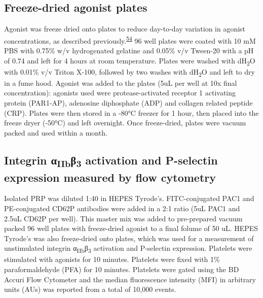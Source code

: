 \documentclass[11pt,twoside]{bristolthesis}
\begin{document}
\hypertarget{freeze-dried-agonist-plates}{%
\subsection{Freeze-dried agonist plates}\label{freeze-dried-agonist-plates}}

Agonist was freeze dried onto plates to reduce day-to-day variation in agonist concentrations, as described previously.\textsuperscript{\protect\hyperlink{ref-Chan2018}{54}} 96 well plates were coated with 10 mM PBS with 0.75\% w/v hydrogenated gelatine and 0.05\% v/v Tween-20 with a pH of 0.74 and left for 4 hours at room temperature. Plates were washed with dH\textsubscript{2}O with 0.01\% v/v Triton X-100, followed by two washes with dH\textsubscript{2}O and left to dry in a fume hood. Agonist was added to the plates (5uL per well at 10x final concentration): agonists used were protease-activated receptor 1 activating protein (PAR1-AP), adenosine diphosphate (ADP) and collagen related peptide (CRP). Plates were then stored in a -80°C freezer for 1 hour, then placed into the freeze dryer (-50°C) and left overnight. Once freeze-dried, plates were vacuum packed and used within a month.

\hypertarget{integrin-ux3b1iibux3b23-activation-and-p-selectin-expression-measured-by-flow-cytometry}{%
\subsection{\texorpdfstring{Integrin α\textsubscript{IIb}β\textsubscript{3} activation and P-selectin expression measured by flow cytometry}{Integrin αIIbβ3 activation and P-selectin expression measured by flow cytometry}}\label{integrin-ux3b1iibux3b23-activation-and-p-selectin-expression-measured-by-flow-cytometry}}

Isolated PRP was diluted 1:40 in HEPES Tyrode's. FITC-conjugated PAC1 and PE-conjugated CD62P antibodies were added in a 2:1 ratio (5uL PAC1 and 2.5uL CD62P per well). This master mix was added to pre-prepared vacuum packed 96 well plates with freeze-dried agonist to a final folume of 50 uL. HEPES Tyrode's was also freeze-dried onto plates, which was used for a measurement of unstimulated integrin α\textsubscript{IIb}β\textsubscript{3} activation and P-selectin expression. Platelets were stimulated with agonists for 10 minutes. Platelets were fixed with 1\% paraformaldehyde (PFA) for 10 minutes. Platelets were gated using the BD Accuri Flow Cytometer and the median fluorescence intensity (MFI) in arbitrary units (AUs) was reported from a total of 10,000 events.
\end{document}
